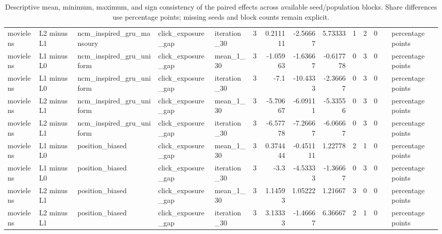 \begin{table}[htbp!]
\begin{tabular}{lllllrrrrrrrll}
movielens & L2 minus L1 & ncm\_inspired\_gru\_mansoury & click\_exposure\_gap & iteration\_30 & 3 & 0.211111 & -2.56667 & 5.73333 & 1 & 2 & 0 &  & percentage points \\
movielens & L1 minus L0 & ncm\_inspired\_gru\_uniform & click\_exposure\_gap & mean\_1\_30 & 3 & -1.05963 & -1.63667 & -0.617778 & 0 & 3 & 0 &  & percentage points \\
movielens & L1 minus L0 & ncm\_inspired\_gru\_uniform & click\_exposure\_gap & iteration\_30 & 3 & -7.1 & -10.4333 & -2.36667 & 0 & 3 & 0 &  & percentage points \\
movielens & L2 minus L1 & ncm\_inspired\_gru\_uniform & click\_exposure\_gap & mean\_1\_30 & 3 & -5.70667 & -6.09111 & -5.33556 & 0 & 3 & 0 &  & percentage points \\
movielens & L2 minus L1 & ncm\_inspired\_gru\_uniform & click\_exposure\_gap & iteration\_30 & 3 & -6.57778 & -7.26667 & -6.06667 & 0 & 3 & 0 &  & percentage points \\
movielens & L1 minus L0 & position\_biased & click\_exposure\_gap & mean\_1\_30 & 3 & 0.374444 & -0.451111 & 1.22778 & 2 & 1 & 0 &  & percentage points \\
movielens & L1 minus L0 & position\_biased & click\_exposure\_gap & iteration\_30 & 3 & -3.3 & -4.53333 & -1.36667 & 0 & 3 & 0 &  & percentage points \\
movielens & L2 minus L1 & position\_biased & click\_exposure\_gap & mean\_1\_30 & 3 & 1.14593 & 1.05222 & 1.21667 & 3 & 0 & 0 &  & percentage points \\
movielens & L2 minus L1 & position\_biased & click\_exposure\_gap & iteration\_30 & 3 & 3.13333 & -1.46667 & 6.36667 & 2 & 1 & 0 &  & percentage points \\
\hline
\end{tabular}
\caption{Descriptive mean, minimum, maximum, and sign consistency of the paired effects across available seed/population blocks. Share differences use percentage points; missing seeds and block counts remain explicit.}
\label{chap:results:tab:rq2_seed_consistency_click_exposure_gap}
\end{table}
